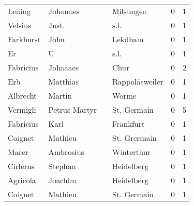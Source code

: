 \begin{tabular}{llllrr}
                   Lening &                           Johannes &             &                                   Milsungen &          0 &         1 \\
                  Velsius &                              Just. &             &                                        s.l. &          0 &         1 \\
                Farkhurst &                               John &             &                                     Lekdham &          0 &         1 \\
                       Er &                                  U &             &                                        s.l. &          0 &         1 \\
                Fabricius &                           Johaaaes &             &                                        Chur &          0 &         2 \\
                      Erb &                           Matthias &             &                              Rappoläsweiler &          0 &         1 \\
                 Albrecht &                             Martin &             &                                       Worms &          0 &         1 \\
                 Vermigli &                      Petrus Martyr &             &                                 St. Germain &          0 &         5 \\
                Fabricius &                               Karl &             &                                   Frankfurt &          0 &         1 \\
                  Coignet &                            Mathieu &             &                                St. Grermain &          0 &         1 \\
                    Marer &                          Ambrosius &             &                                  Winterthur &          0 &         1 \\
                 Cirlerus &                            Stephan &             &                                  Heidelberg &          0 &         1 \\
                 Agricola &                            Joachlm &             &                                  Heidelberg &          0 &         1 \\
                  Coignet &                            Mathieu &             &                                 St. Germain &          0 &         1 \\

\end{tabular}

